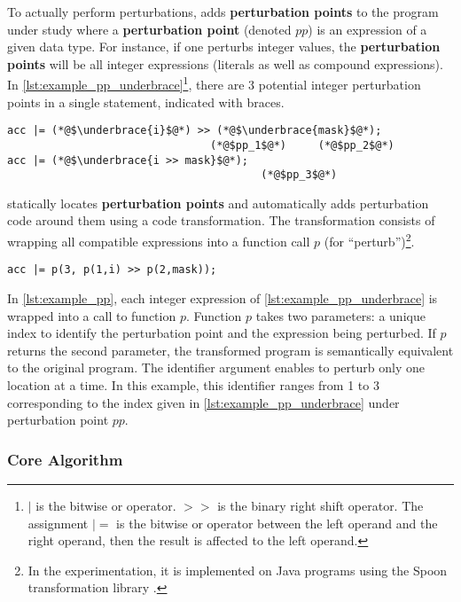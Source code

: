 To actually perform perturbations, \perturb adds \textbf{perturbation points} to the program under study where a \textbf{perturbation point} (denoted $pp$) is an expression of a given data type.
For instance, if one perturbs integer values, the \textbf{perturbation points} will be all integer expressions (literals as well as compound expressions). 
In \autoref{lst:example_pp_underbrace}\footnote{$|$ is the bitwise or operator. $>>$ is the binary right shift operator. The assignment $|=$ is the bitwise or operator between the left operand and the right operand, then the result is affected to the left operand.}, there are 3 potential integer perturbation points in a single statement, indicated with braces.
\begin{lstlisting}[basicstyle=\small, caption=Three integer \textbf{perturbation points} in a single statement., label=lst:example_pp_underbrace]
acc |= (*@$\underbrace{i}$@*) >> (*@$\underbrace{mask}$@*);
								(*@$pp_1$@*)     (*@$pp_2$@*)
acc |= (*@$\underbrace{i >> mask}$@*);
										(*@$pp_3$@*)  
\end{lstlisting}

\perturb statically locates \textbf{perturbation points} and automatically adds perturbation code around them using a code transformation. 
The transformation consists of wrapping all compatible expressions into a function call $p$ (for ``perturb'')\footnote{In the experimentation, it is implemented on Java programs using the Spoon transformation library \cite{pawlak:hal-01169705}.}.

\begin{lstlisting}[basicstyle=\small, caption=The same statement with perturbation code injected., label=lst:example_pp]
acc |= p(3, p(1,i) >> p(2,mask));
\end{lstlisting}

In \autoref{lst:example_pp}, each integer expression of \autoref{lst:example_pp_underbrace} is wrapped into a call to function $p$.
Function $p$ takes two parameters: a unique index to identify the perturbation point and the expression being perturbed.
If $p$ returns  the second parameter, the transformed program is semantically equivalent to the original program. 
The identifier argument enables \perturb to perturb only one location at a time. 
In this example, this identifier ranges from 1 to 3 corresponding to the index given in \autoref{lst:example_pp_underbrace} under perturbation point $pp$.

\subsubsection{Core Algorithm}
\label{subsubsec:transversal-contributions:correctness:protocol:algo}

